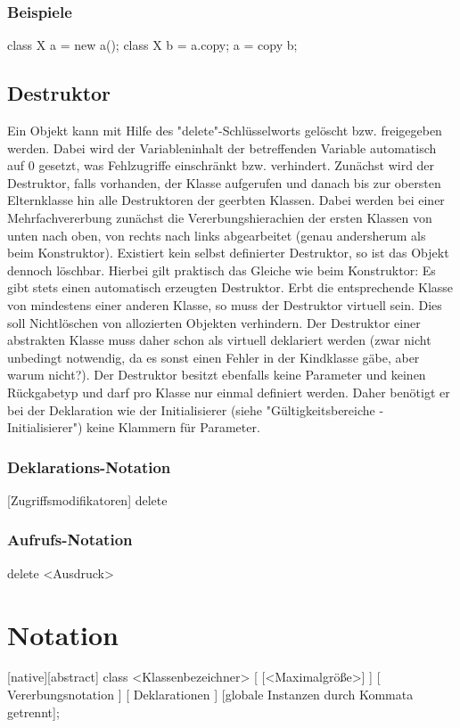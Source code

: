 \subsubsection{Beispiele}
class X a = new a();
class X b = a.copy;
a = copy b;

\subsection{Destruktor}
Ein Objekt kann mit Hilfe des "delete"-Schlüsselworts gelöscht bzw. freigegeben werden.
Dabei wird der Variableninhalt der betreffenden Variable automatisch auf 0 gesetzt, was Fehlzugriffe einschränkt bzw. verhindert.
Zunächst wird der Destruktor, falls vorhanden, der Klasse aufgerufen und danach bis zur obersten Elternklasse hin alle Destruktoren
der geerbten Klassen. Dabei werden bei einer Mehrfachvererbung zunächst die Vererbungshierachien der ersten Klassen von unten nach oben,
von rechts nach links abgearbeitet (genau andersherum als beim Konstruktor).
Existiert kein selbst definierter Destruktor, so ist das Objekt dennoch löschbar. Hierbei gilt praktisch das Gleiche wie beim Konstruktor:
Es gibt stets einen automatisch erzeugten Destruktor.
Erbt die entsprechende Klasse von mindestens einer anderen Klasse, so muss der Destruktor virtuell sein. Dies soll Nichtlöschen von allozierten
Objekten verhindern.
Der Destruktor einer abstrakten Klasse muss daher schon als virtuell deklariert werden (zwar nicht unbedingt notwendig, da es sonst einen Fehler in
der Kindklasse gäbe, aber warum nicht?).
Der Destruktor besitzt ebenfalls keine Parameter und keinen Rückgabetyp und darf pro Klasse nur einmal definiert werden.
Daher benötigt er bei der Deklaration wie der Initialisierer (siehe "Gültigkeitsbereiche - Initialisierer") keine Klammern für Parameter.

\subsubsection{Deklarations-Notation}
[Zugriffsmodifikatoren] delete { }

\subsubsection{Aufrufs-Notation}
delete <Ausdruck>

\section{Notation}
[native][abstract] class <Klassenbezeichner> [ [<Maximalgröße>] ] [ Vererbungsnotation ]
{
	[ Deklarationen ]
} [globale Instanzen durch Kommata getrennt];
